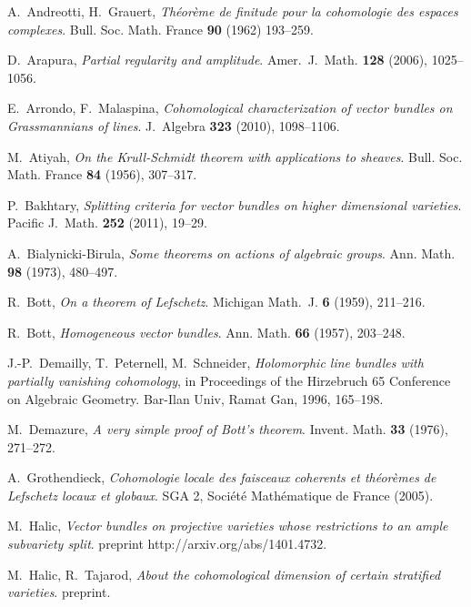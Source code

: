\documentclass[11pt,reqno]{amsart}
\numberwithin{equation}{section}
\numberwithin{figure}{section}
\begin{document}
\begin{thebibliography}{ooo}

 \textrm{A.~Andreotti, H.~Grauert}, 
\textit{Th\'eor\`eme de finitude pour la cohomologie des espaces complexes}. 
Bull. Soc. Math. France \textbf{90} (1962) 193--259.

 \textrm{D.~Arapura},
\textit{Partial regularity and amplitude}. 
Amer.~J.~Math. \textbf{128} (2006), 1025--1056. 

 \textrm{E.~Arrondo, F.~Malaspina}, 
\textit{Cohomological characterization of vector bundles on Grassmannians of lines}. 
J.~Algebra \textbf{323} (2010), 1098--1106.

 \textrm{M.~Atiyah}, 
\textit{On the Krull-Schmidt theorem with applications to sheaves}. 
Bull. Soc. Math. France \textbf{84} (1956), 307--317.

 \textrm{P.~Bakhtary}, 
\textit{Splitting criteria for vector bundles on higher dimensional varieties}. 
Pacific J.~Math. \textbf{252} (2011), 19--29.

 \textrm{A.~Bialynicki-Birula}, 
\textit{Some theorems on actions of algebraic groups}. 
Ann. Math. \textbf{98} (1973), 480--497.

 \textrm{R.~Bott}, 
\textit{On a theorem of Lefschetz}. 
Michigan Math.~J. \textbf{6} (1959), 211--216.

 \textrm{R.~Bott}, 
\textit{Homogeneous vector bundles}. 
Ann. Math. \textbf{66} (1957), 203--248.

 \textrm{J.-P.~Demailly, T.~Peternell, M.~Schneider}, 
\textit{Holomorphic line bundles with partially vanishing cohomology}, 
in Proceedings of the Hirzebruch 65 Conference on Algebraic Geometry. 
Bar-Ilan Univ, Ramat Gan, 1996, 165--198.

 \textrm{M.~Demazure},
\textit{A very simple proof of Bott's theorem}.
Invent. Math. \textbf{33} (1976), 271--272.

 \textrm{A.~Grothendieck}, 
\textit{Cohomologie locale des faisceaux coherents et th\'eor\`emes de Lefschetz 
locaux et globaux}. 
SGA 2, Soci\'et\'e Math\'ematique de France (2005).

 \textrm{M.~Halic}, 
\textit{Vector bundles on projective varieties whose restrictions 
to an ample subvariety split}. preprint http://arxiv.org/abs/1401.4732.

 \textrm{M.~Halic, R.~Tajarod}, 
\textit{About the cohomological dimension of certain stratified varieties}. 
preprint. 


\end{thebibliography}
\end{document}
